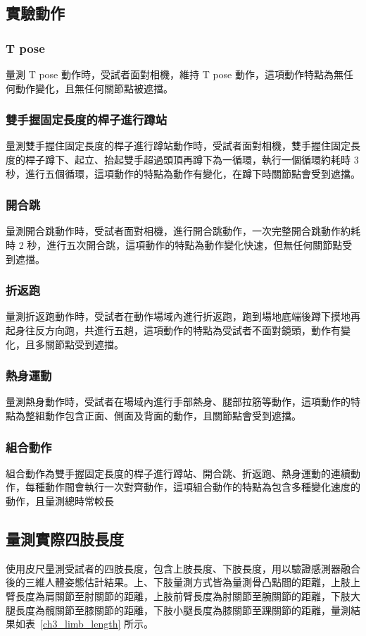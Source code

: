 \subsection{實驗動作}
\subsubsection*{T pose}
量測 T pose 動作時，受試者面對相機，維持 T pose 動作，這項動作特點為無任何動作變化，且無任何關節點被遮擋。
    
\subsubsection*{雙手握固定長度的桿子進行蹲站}
量測雙手握住固定長度的桿子進行蹲站動作時，受試者面對相機，雙手握住固定長度的桿子蹲下、起立、抬起雙手超過頭頂再蹲下為一循環，執行一個循環約耗時 3 秒，進行五個循環，這項動作的特點為動作有變化，在蹲下時關節點會受到遮擋。
    
\subsubsection*{開合跳}
量測開合跳動作時，受試者面對相機，進行開合跳動作，一次完整開合跳動作約耗時 2 秒，進行五次開合跳，這項動作的特點為動作變化快速，但無任何關節點受到遮擋。
    
\subsubsection*{折返跑}
量測折返跑動作時，受試者在動作場域內進行折返跑，跑到場地底端後蹲下摸地再起身往反方向跑，共進行五趟，這項動作的特點為受試者不面對鏡頭，動作有變化，且多關節點受到遮擋。
    
\subsubsection*{熱身運動}
量測熱身動作時，受試者在場域內進行手部熱身、腿部拉筋等動作，這項動作的特點為整組動作包含正面、側面及背面的動作，且關節點會受到遮擋。
    
\subsubsection*{組合動作}
組合動作為雙手握固定長度的桿子進行蹲站、開合跳、折返跑、熱身運動的連續動作，每種動作間會執行一次對齊動作，這項組合動作的特點為包含多種變化速度的動作，且量測總時常較長

\subsection{量測實際四肢長度}
使用皮尺量測受試者的四肢長度，包含上肢長度、下肢長度，用以驗證感測器融合後的三維人體姿態估計結果。上、下肢量測方式皆為量測骨凸點間的距離，上肢上臂長度為肩關節至肘關節的距離，上肢前臂長度為肘關節至腕關節的距離，下肢大腿長度為髖關節至膝關節的距離，下肢小腿長度為膝關節至踝關節的距離，量測結果如表~\ref{ch3_limb_length} 所示。

